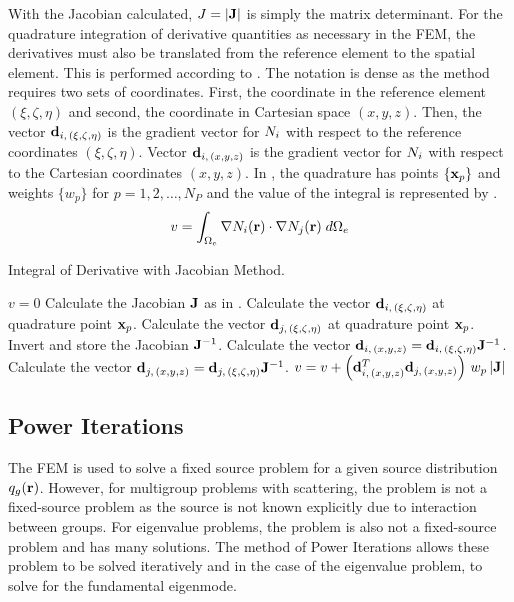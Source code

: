     With the Jacobian calculated, $J=\lvert\mathbf{J}\rvert$ is simply the matrix 
    determinant. For the quadrature integration of derivative quantities as
    necessary in the FEM, the derivatives must also be translated from the
    reference element to the spatial element. This is performed according to 
    . The notation is dense as the method
    requires two sets of coordinates. First, the coordinate in the reference
    element $(\xi,\zeta,\eta)$ and second, the coordinate in Cartesian space
    $(x,y,z)$.
    Then, the vector $\mathbf{d}_{i,\,(\xi,\zeta,\eta)}$ is the gradient vector for
    $N_i$ with respect to the reference coordinates $(\xi,\zeta,\eta)$.
    Vector $\mathbf{d}_{i,\,(x,y,z)}$ is the gradient vector for $N_i$ with
    respect to the Cartesian coordinates $(x,y,z)$. In 
    , the quadrature has points $\{\mathbf{x}_p\}$ and 
    weights $\{w_p\}$ for $p = 1,2,\ldots,N_P$ and the value of the integral is
    represented by .
    \begin{equation}
      \label{eq:deriv_integral}
      v = \int_{\Omega_e} \mathbf{\nabla} N_i(\mathbf{r}) \cdot \mathbf{\nabla} N_j(\mathbf{r}) \;
      d\Omega_e
    \end{equation}

    \begin{algorithm}
      \caption{Integral of Derivative with Jacobian Method.}
      \label{algorithm:deriv_int}
      \begin{algorithmic}[1]
        \State $v=0$
          \State Calculate the Jacobian $\mathbf{J}$ as in .
          \State Calculate the vector $\mathbf{d}_{i,\,(\xi,\zeta,\eta)}$ at quadrature
            point $\mathbf{x}_p$.
          \State Calculate the vector $\mathbf{d}_{j,\,(\xi,\zeta,\eta)}$ at quadrature
            point $\mathbf{x}_p$.
          \State Invert and store the Jacobian $\mathbf{J}^{-1}$.
          \State Calculate the vector $\mathbf{d}_{i,\,(x,y,z)} =
            \mathbf{d}_{i,\,(\xi,\zeta,\eta)} \mathbf{J}^{-1}$.
          \State Calculate the vector $\mathbf{d}_{j,\,(x,y,z)} =
            \mathbf{d}_{j,\,(\xi,\zeta,\eta)} \mathbf{J}^{-1}$.
          \State $v = v + \left(\mathbf{d}_{i,\,(x,y,z)}^{T} \mathbf{d}_{j,\,(x,y,z)}\right)
            \, w_p \, \lvert \mathbf{J} \rvert$
        \EndFor
      \end{algorithmic}
    \end{algorithm}

\subsection{Power Iterations}
  \label{sec:power_iterations}
  The FEM is used to solve a fixed source problem for a given source
  distribution $q_g(\mathbf{r})$. However, for multigroup problems with scattering, 
  the problem is not a fixed-source problem as the source is not known
  explicitly due to interaction between groups. For eigenvalue problems, the
  problem is also not a fixed-source problem and has many solutions. The method 
  of Power Iterations allows these problem to be solved iteratively and in the
  case of the eigenvalue problem, to solve for the fundamental eigenmode.

